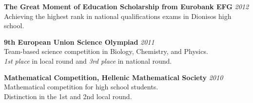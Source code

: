 \documentclass[margin]{res}
\begin{document}
\begin{resume}
\textbf{The Great Moment of Education Scholarship from Eurobank EFG}  \hfill {\em 2012} \\ 
Achieving the highest rank in national qualifications exams in Dionisos high school.

\textbf{9th European Union Science Olympiad} \hfill {\em 2011} \\ 
Team-based science competition in Biology, Chemistry, and Physics.\\
\textit{1st place} in local round and \textit{3rd place} in  national round. 

\textbf{Mathematical Competition, Hellenic Mathematical Society} \hfill {\em 2010} \\ 
Mathematical competition for high school students. \\
Distinction in the 1st and 2nd local round. 








\end{resume}
\end{document}

